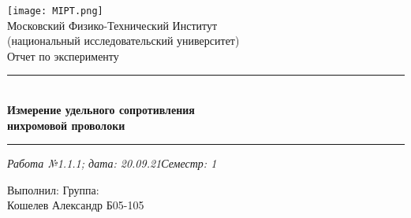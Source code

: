 \documentclass[12pt,a4paper]{scrartcl}
\begin{document}
	\graphicspath{{C:/Users/Alex/OneDrive/Изображения/TexImgs}}
	
	\newcommand{\ms}{\mathstrut}
	\newcommand{\msp}{\hspace{0.5cm}}
	\newcommand{\al}{\alpha}
	\newcommand{\dg}{^\circ}
	\newcommand{\qd}[2]{^{\frac{#1}{#2}}}
	\newcommand{\qdm}[2]{^{-\frac{#1}{#2}}}
	\newcommand{\lm}[2]{\underset{#1 \rightarrow #2}{\lim}}
	\newcommand{\sfrac}[2]{\dfrac{\strut #1}{\strut #2}}
	\newcommand{\equal}[1]{\overset{(#1)}{=}}
	\newcommand{\linevdots}{\ \raisebox{-.08\height}{\vdots}\ }
	\newcommand{\linecvdots}{\ \raisebox{-.08\height}{\vdots}\hspace{-0.13cm}\raisebox{.15\height}{\cancel{\phantom{a}}\hspace{0.06cm}}}
	\newcommand{\combox}[1]{\ms \msp \msp \begin{minipage}{0.95\linewidth}
			#1
	\end{minipage}}
	
	\newtheorem{pr}{Задача}
	\newtheorem{ex}{Пример}
	
	\newenvironment{slv}{\ms \msp \textit{Решение:}}{}
	\newenvironment{proof}{\ms \msp \textit{Доказательство: }}{\hfill $\square$}
	
	\begin{titlepage}
		
		\vspace*{\fill}
		
		\begin{center}
			\texttt{[image: MIPT.png]}
			\\[0.7cm]\Huge Московский Физико-Технический Институт\\(национальный исследовательский университет)
			\\[2cm]\LARGE Отчет по эксперименту
			\\[0.5cm]\noindent\rule{\textwidth}{1pt}
			\\\Huge\textbf{Измерение удельного сопротивления\\нихромовой проволоки}
			\\[-0.5cm]\noindent\rule{\textwidth}{1pt}
		\end{center}
		
		\begin{flushleft}
			\textit{Работа №1.1.1; дата: 20.09.21}\hfill\textit{Семестр: 1}
		\end{flushleft}
		
		\vspace*{\fill}
		
		\begin{flushleft}
			Выполнил: \hspace{\fill} Группа:
			\\Кошелев Александр \hspace{\fill} Б05-105
		\end{flushleft}
	\end{titlepage}
	
\end{document}
